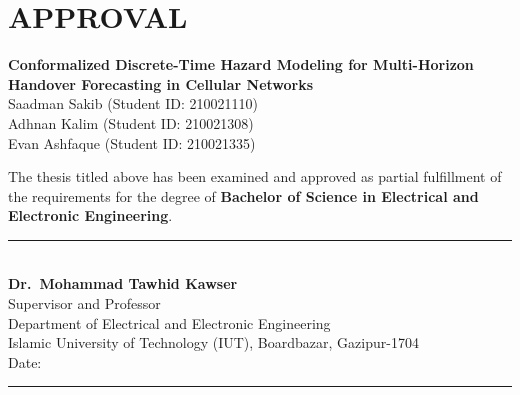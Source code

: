 \chapter*{APPROVAL}

\begin{center}
\textbf{\large Conformalized Discrete-Time Hazard Modeling for Multi-Horizon Handover Forecasting in Cellular Networks}\\[0.8em]
Saadman Sakib (Student ID: 210021110)\\
Adhnan Kalim (Student ID: 210021308)\\
Evan Ashfaque (Student ID: 210021335)
\end{center}

\vspace{1.5em}
The thesis titled above has been examined and approved as partial fulfillment of the requirements for the degree of \textbf{Bachelor of Science in Electrical and Electronic Engineering}.

\vspace{4.5cm}
\begin{center}
\rule{8.0cm}{0.4pt}\\[0.5em]
\textbf{Dr.~Mohammad Tawhid Kawser}\\[0.3em]
Supervisor and Professor\\[0.3em]
Department of Electrical and Electronic Engineering\\
Islamic University of Technology (IUT), Boardbazar, Gazipur-1704\\[0.8em]
Date: \rule{4.0cm}{0.4pt}
\end{center}

